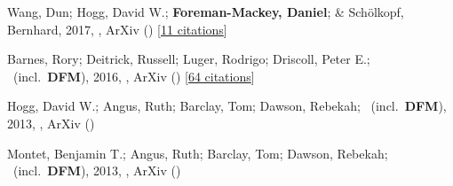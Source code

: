 \item[{\color{numcolor}\scriptsize4}] Wang, Dun; Hogg, David W.; \textbf{Foreman-Mackey, Daniel}; \& Sch{\"o}lkopf, Bernhard, 2017, , ArXiv () [\href{https://ui.adsabs.harvard.edu/abs/2017arXiv171002428W}{11 citations}]

\item[{\color{numcolor}\scriptsize3}] Barnes, Rory; Deitrick, Russell; Luger, Rodrigo; Driscoll, Peter E.; \etal\ (incl.\ \textbf{DFM}), 2016, , ArXiv () [\href{https://ui.adsabs.harvard.edu/abs/2016arXiv160806919B}{64 citations}]

\item[{\color{numcolor}\scriptsize2}] Hogg, David W.; Angus, Ruth; Barclay, Tom; Dawson, Rebekah; \etal\ (incl.\ \textbf{DFM}), 2013, , ArXiv ()

\item[{\color{numcolor}\scriptsize1}] Montet, Benjamin T.; Angus, Ruth; Barclay, Tom; Dawson, Rebekah; \etal\ (incl.\ \textbf{DFM}), 2013, , ArXiv ()